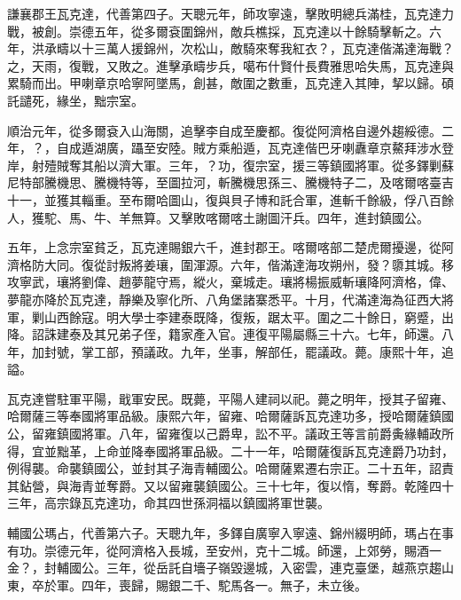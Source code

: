 \begin{pinyinscope}
謙襄郡王瓦克達，代善第四子。天聰元年，師攻寧遠，擊敗明總兵滿桂，瓦克達力戰，被創。崇德五年，從多爾袞圍錦州，敵兵樵採，瓦克達以十餘騎擊斬之。六年，洪承疇以十三萬人援錦州，次松山，敵騎來奪我紅衣？，瓦克達偕滿達海戰？之，天雨，復戰，又敗之。進擊承疇步兵，噶布什賢什長費雅思哈失馬，瓦克達與累騎而出。甲喇章京哈寧阿墜馬，創甚，敵圍之數重，瓦克達入其陣，挈以歸。碩託譴死，緣坐，黜宗室。

順治元年，從多爾袞入山海關，追擊李自成至慶都。復從阿濟格自邊外趨綏德。二年，？，自成遁湖廣，躡至安陸。賊方乘船遁，瓦克達偕巴牙喇纛章京鰲拜涉水登岸，射殪賊奪其船以濟大軍。三年，？功，復宗室，援三等鎮國將軍。從多鐸剿蘇尼特部騰機思、騰機特等，至圖拉河，斬騰機思孫三、騰機特子二，及喀爾喀臺吉十一，並獲其輜重。至布爾哈圖山，復與貝子博和託合軍，進斬千餘級，俘八百餘人，獲駝、馬、牛、羊無算。又擊敗喀爾喀土謝圖汗兵。四年，進封鎮國公。

五年，上念宗室貧乏，瓦克達賜銀六千，進封郡王。喀爾喀部二楚虎爾擾邊，從阿濟格防大同。復從討叛將姜瓖，圍渾源。六年，偕滿達海攻朔州，發？隳其城。移攻寧武，瓖將劉偉、趙夢龍守焉，縱火，棄城走。瓖將楊振威斬瓖降阿濟格，偉、夢龍亦降於瓦克達，靜樂及寧化所、八角堡諸寨悉平。十月，代滿達海為征西大將軍，剿山西餘寇。明大學士李建泰既降，復叛，踞太平。圍之二十餘日，窮蹙，出降。詔誅建泰及其兄弟子侄，籍家產入官。連復平陽屬縣三十六。七年，師還。八年，加封號，掌工部，預議政。九年，坐事，解部任，罷議政。薨。康熙十年，追謚。

瓦克達嘗駐軍平陽，戢軍安民。既薨，平陽人建祠以祀。薨之明年，授其子留雍、哈爾薩三等奉國將軍品級。康熙六年，留雍、哈爾薩訴瓦克達功多，授哈爾薩鎮國公，留雍鎮國將軍。八年，留雍復以己爵卑，訟不平。議政王等言前爵夤緣輔政所得，宜並黜革，上命並降奉國將軍品級。二十一年，哈爾薩復訴瓦克達爵乃功封，例得襲。命襲鎮國公，並封其子海青輔國公。哈爾薩累遷右宗正。二十五年，詔責其鉆營，與海青並奪爵。又以留雍襲鎮國公。三十七年，復以惰，奪爵。乾隆四十三年，高宗錄瓦克達功，命其四世孫洞福以鎮國將軍世襲。

輔國公瑪占，代善第六子。天聰九年，多鐸自廣寧入寧遠、錦州綴明師，瑪占在事有功。崇德元年，從阿濟格入長城，至安州，克十二城。師還，上郊勞，賜酒一金？，封輔國公。三年，從岳託自墻子嶺毀邊城，入密雲，連克臺堡，越燕京趨山東，卒於軍。四年，喪歸，賜銀二千、駝馬各一。無子，未立後。


\end{pinyinscope}
